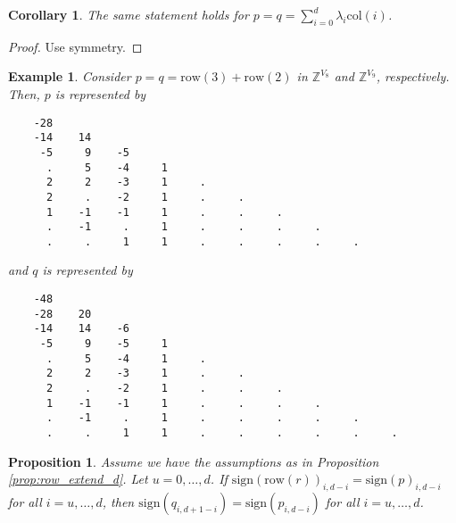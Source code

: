\documentclass[11pt]{article}
\newtheorem{proposition}[theorem]{Proposition}
\newtheorem{corollary}[theorem]{Corollary}
\newtheorem{example}[theorem]{Example}
\begin{document}
\begin{corollary}
  The same statement holds for \( p = q = \sum_{i=0}^{d}  \lambda_{i} \mathrm{col}(i) \).
\end{corollary}

\begin{proof}
  Use symmetry.
\end{proof}



\begin{example}
  Consider \( p = q = \mathrm{row}(3) + \mathrm{row}(2) \) in \( \mathbb{Z}^{V_8} \) and \( \mathbb{Z}^{V_9} \), respectively. Then, \( p \) is represented by 
  \begin{verbatim}
    -28
    -14    14
     -5     9    -5
      .     5    -4     1
      2     2    -3     1     .
      2     .    -2     1     .     .
      1    -1    -1     1     .     .     .
      .    -1     .     1     .     .     .     .
      .     .     1     1     .     .     .     .     .
  \end{verbatim}
  and \( q \) is represented by
  \begin{verbatim}
    -48
    -28    20
    -14    14    -6
     -5     9    -5     1
      .     5    -4     1     . 
      2     2    -3     1     .     .
      2     .    -2     1     .     .     .
      1    -1    -1     1     .     .     .     .
      .    -1     .     1     .     .     .     .     .
      .     .     1     1     .     .     .     .     .     .
  \end{verbatim}
\end{example}


\begin{proposition}\label{prop:sign_row_propagation}
  Assume we have the assumptions as in Proposition \ref{prop:row_extend_d}. Let \( u = 0, \dots, d \). If $\mathrm{sign}(\mathrm{row}(r))_{i,d-i} = \mathrm{sign}(p)_{i,d-i}$ for all \( i = u, \dots, d\), then \( \mathrm{sign}(q_{i,d+1-i}) = \mathrm{sign}(p_{i,d-i}) \) for all \( i = u, \dots, d\).
\end{proposition}
\end{document}
